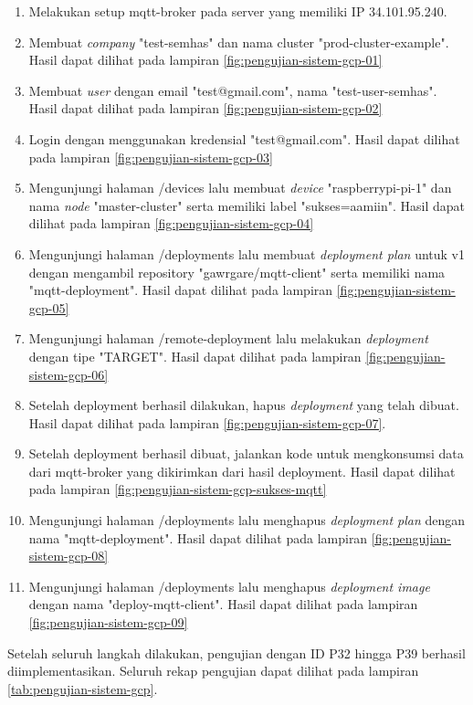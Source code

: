 \begin{enumerate}
  \item Melakukan setup mqtt-broker pada server yang memiliki IP 34.101.95.240.
  \item Membuat \textit{company} "test-semhas" dan nama cluster "prod-cluster-example". Hasil dapat dilihat pada lampiran \ref{fig:pengujian-sistem-gcp-01}
  \item Membuat \textit{user} dengan email "test@gmail.com", nama "test-user-semhas". Hasil dapat dilihat pada lampiran \ref{fig:pengujian-sistem-gcp-02}
  \item Login dengan menggunakan kredensial "test@gmail.com". Hasil dapat dilihat pada lampiran \ref{fig:pengujian-sistem-gcp-03}
  \item Mengunjungi halaman /devices lalu membuat \textit{device} "raspberrypi-pi-1" dan nama \textit{node} "master-cluster" serta memiliki label "sukses=aamiin". Hasil dapat dilihat pada lampiran \ref{fig:pengujian-sistem-gcp-04}
  \item Mengunjungi halaman /deployments lalu membuat \textit{deployment plan} untuk v1 dengan mengambil repository "gawrgare/mqtt-client" serta memiliki nama "mqtt-deployment". Hasil dapat dilihat pada lampiran \ref{fig:pengujian-sistem-gcp-05}
  \item Mengunjungi halaman /remote-deployment lalu melakukan \textit{deployment} dengan tipe "TARGET". Hasil dapat dilihat pada lampiran \ref{fig:pengujian-sistem-gcp-06}
  \item Setelah deployment berhasil dilakukan, hapus \textit{deployment} yang telah dibuat. Hasil dapat dilihat pada lampiran \ref{fig:pengujian-sistem-gcp-07}.
  \item Setelah deployment berhasil dibuat, jalankan kode untuk mengkonsumsi data dari mqtt-broker yang dikirimkan dari hasil deployment. Hasil dapat dilihat pada lampiran \ref{fig:pengujian-sistem-gcp-sukses-mqtt}
  \item Mengunjungi halaman /deployments lalu menghapus \textit{deployment plan} dengan nama "mqtt-deployment". Hasil dapat dilihat pada lampiran \ref{fig:pengujian-sistem-gcp-08}
  \item Mengunjungi halaman /deployments lalu menghapus \textit{deployment image} dengan nama "deploy-mqtt-client". Hasil dapat dilihat pada lampiran \ref{fig:pengujian-sistem-gcp-09}
\end{enumerate}

Setelah seluruh langkah dilakukan, pengujian dengan ID P32 hingga P39 berhasil diimplementasikan. Seluruh rekap pengujian dapat dilihat pada lampiran \ref{tab:pengujian-sistem-gcp}.